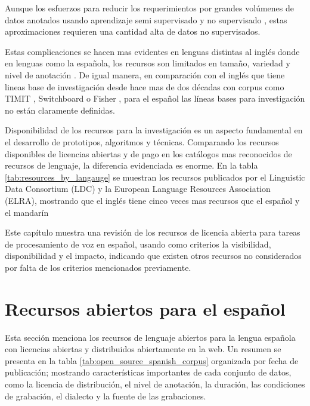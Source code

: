 \documentclass[a4paper,12pt,twoside]{report}
\begin{document}
Aunque los esfuerzos para reducir los requerimientos por grandes volúmenes de datos anotados usando aprendizaje semi supervisado \cite{AmazonSemiSupervised} y no supervisado \cite{ZeroResources}, estas aproximaciones requieren una cantidad alta de datos no supervisados.

Estas complicaciones se hacen mas evidentes en lenguas distintas al inglés donde en lenguas como la española, los recursos son limitados en tamaño, variedad y nivel de anotación \cite{HernndezMena2017}. De igual manera, en comparación con el inglés que  tiene lineas base de investigación desde hace mas de dos décadas con corpus como TIMIT \cite{TIMIT}, Switchboard \cite{Switchboard} o Fisher \cite{Fisher}, para el español las líneas bases para investigación no están claramente definidas.

Disponibilidad de los recursos para la investigación es un aspecto fundamental en el desarrollo de prototipos, algoritmos y técnicas. Comparando los recursos disponibles de licencias abiertas y de pago en los catálogos mas reconocidos de recursos de lenguaje, la diferencia evidenciada es enorme. En la tabla \ref{tab:resources_by_langauge} se muestran los recursos publicados por el Linguistic Data Consortium (LDC) y la European Language Resources Association (ELRA), mostrando que el inglés tiene cinco veces mas recursos que el español y el mandarín



Este capítulo muestra una revisión de los recursos de licencia abierta para tareas de procesamiento de voz en español, usando como criterios la visibilidad, disponibilidad y el impacto, indicando que existen otros recursos no considerados por falta de los criterios mencionados previamente.


\section{Recursos abiertos para el español}

Esta sección menciona los recursos de lenguaje abiertos para la lengua española con licencias abiertas y distribuidos abiertamente en la web. Un resumen se presenta en la tabla \ref{tab:open_source_spanish_corpus} organizada por fecha de publicación; mostrando características importantes de cada conjunto de datos, como la licencia de distribución, el nivel de anotación, la duración, las condiciones de grabación, el dialecto y la fuente de las grabaciones.
\end{document}
